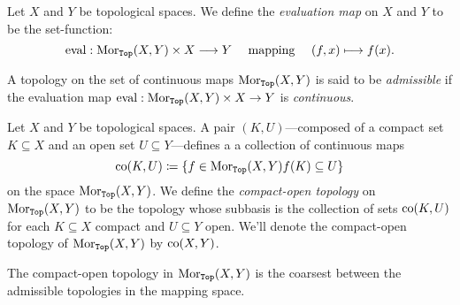 \begin{definition}
    \label{def:evaluation-map}
    Let \(X\) and \(Y\) be topological spaces. We define the \emph{evaluation map}
    on \(X\) and \(Y\) to be the set-function:
    \[
        \operatorname{eval}: \operatorname{Mor}_{{\texttt{Top}}}(X, Y) \times X \longrightarrow Y
        \quad\text{ mapping }\quad
        (f, x) \longmapsto f(x).
    \]
\end{definition}

\begin{definition}
    \label{def:admissible-topology}
    A topology on the set of continuous maps \(\operatorname{Mor}_{{\texttt{Top}}}(X, Y)\) is said to be
    \emph{admissible} if the evaluation map
    \(\operatorname{eval}: \operatorname{Mor}_{{\texttt{Top}}}(X, Y) \times X \to Y\) is \emph{continuous}.
\end{definition}

\begin{definition}
    \label{def:compact-open-topology}
    Let \(X\) and \(Y\) be topological spaces. A pair \((K, U)\)---composed of a
    compact set \(K \subseteq X\) and an open set \(U \subseteq Y\)---defines a
    a collection of continuous maps
    \[
        \operatorname{co}(K, U) \coloneq \{f \in \operatorname{Mor}_{{\texttt{Top}}}(X, Y) \relax f(K) \subseteq U\}
    \]
    on the space \(\operatorname{Mor}_{{\texttt{Top}}}(X, Y)\). We define the \emph{compact-open topology}
    on \(\operatorname{Mor}_{{\texttt{Top}}}(X, Y)\) to be the topology whose subbasis is the collection of
    sets \(\operatorname{co}(K, U)\) for each \(K \subseteq X\) compact and \(U \subseteq Y\)
    open. We'll denote the compact-open topology of \(\operatorname{Mor}_{{\texttt{Top}}}(X, Y)\) by
    \(\operatorname{co}(X, Y)\).
\end{definition}

\begin{proposition}
    \label{prop:compact-open-is-coarser}
    The compact-open topology in \(\operatorname{Mor}_{{\texttt{Top}}}(X, Y)\) is the coarsest between the
    admissible topologies in the mapping space.
\end{proposition}

